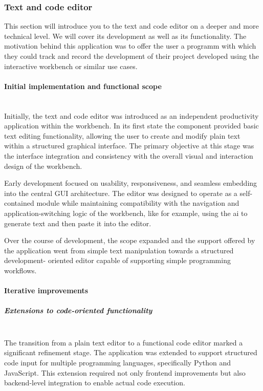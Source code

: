 \documentclass[a4paper,12pt]{article}
\begin{document}
\newpage
\subsubsection{Text and code editor}
This section will introduce you to the text and code editor on a deeper and more technical level. We will cover its development as well as its functionality. 
The motivation behind this application was to offer the user a programm with which they could track and record the development of their project developed using the interactive workbench or similar use cases. 
\paragraph{Initial implementation and functional scope}\mbox{} \\
Initially, the text and code editor was introduced as an independent productivity application within the workbench. In its first state the component provided basic text editing functionality, allowing the user to create and modify plain text within a structured graphical interface. The primary objective at this stage was the interface integration and consistency with the overall visual and interaction design of the workbench. 

Early development focused on usability, responsiveness, and seamless embedding into the central GUI architecture. The editor was designed to operate as a self- contained module while maintaining 
compatibility with the navigation and application-switching logic of the workbench, like for example, using the ai to generate text and then paste it into the editor. 

Over the course of development, the scope expanded and the support offered by the application went from simple text manipulation towards a structured development- oriented editor capable of supporting simple programming workflows. 

\newpage
\paragraph{Iterative improvements}
\subparagraph{Extensions to code-oriented functionality}\mbox{} \\
The transition from a plain text editor to a functional code editor marked a significant refinement stage. The application was extended to support structured code input for multiple programming languages, specifically Python and JavaScript. This extension required not only frontend improvements but also backend-level integration to enable actual code execution.
\end{document}
